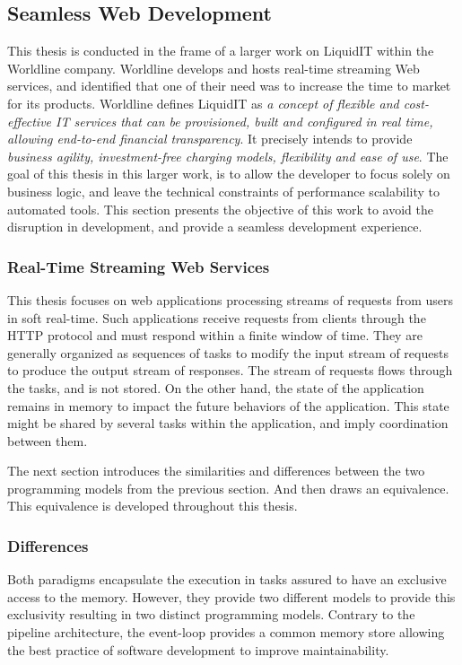 \subsection{Seamless Web Development}

This thesis is conducted in the frame of a larger work on LiquidIT within the Worldline company.
Worldline develops and hosts real-time streaming Web services, and identified that one of their need was to increase the time to market for its products.
Worldline defines LiquidIT as \textit{a concept of flexible and cost-effective IT services that can be provisioned, built and configured in real time, allowing end-to-end financial transparency}.
It precisely intends to provide \textit{business agility, investment-free charging models, flexibility and ease of use}.
The goal of this thesis in this larger work, is to allow the developer to focus solely on business logic, and leave the technical constraints of performance scalability to automated tools.
This section presents the objective of this work to avoid the disruption in development, and provide a seamless development experience.

\subsubsection{Real-Time Streaming Web Services}

This thesis focuses on web applications processing streams of requests from users in soft real-time.
Such applications receive requests from clients through the HTTP protocol and must respond within a finite window of time.
They are generally organized as sequences of tasks to modify the input stream of requests to produce the output stream of responses.
The stream of requests flows through the tasks, and is not stored.
On the other hand, the state of the application remains in memory to impact the future behaviors of the application.
This state might be shared by several tasks within the application, and imply coordination between them.

The next section introduces the similarities and differences between the two programming models from the previous section.
And then draws an equivalence.
This equivalence is developed throughout this thesis.

\subsubsection{Differences}

Both paradigms encapsulate the execution in tasks assured to have an exclusive access to the memory.
However, they provide two different models to provide this exclusivity resulting in two distinct programming models.
Contrary to the pipeline architecture, the event-loop provides a common memory store allowing the best practice of software development to improve maintainability.

